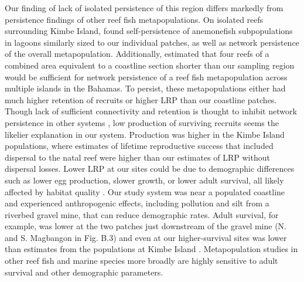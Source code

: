\documentclass[12pt, oneside]{article}   	%
\begin{document}
Our finding of lack of isolated persistence of this region differs markedly from persistence findings of other reef fish metapopulations. On isolated reefs surrounding Kimbe Island, \cite{salles_coral_2015} found self-persistence of anemonefish subpopulations in lagoons similarly sized to our individual patches, as well as network persistence of the overall metapopulation. Additionally, \cite{johnson2018integrating} estimated that four reefs of a combined area equivalent to a coastline section shorter than our sampling region would be sufficient for network persistence of a reef fish metapopulation across multiple islands in the Bahamas. To persist, these metapopulations either had much higher retention of recruits or higher LRP than our coastline patches. Though lack of sufficient connectivity and retention is thought to inhibit network persistence in other systems \citep[e.g., insufficient retention of offspring within reserves for eastern oysters (\textit{Crassostrea virginica}) in North Carolina;][]{puckett2016metapopulation}, low production of surviving recruits seems the likelier explanation in our system. Production was higher in the Kimbe Island populations, where estimates of lifetime reproductive success that included dispersal to the natal reef \citep{salles2020strong} were higher than our estimates of LRP without dispersal losses. Lower LRP at our sites could be due to demographic differences such as lower egg production, slower growth, or lower adult survival, all likely affected by habitat quality \citep[e.g.][]{salles2020strong, hayashi2019low}. Our study system was near a populated coastline and experienced anthropogenic effects, including pollution and silt from a riverbed gravel mine, that can reduce demographic rates. Adult survival, for example, was lower at the two patches just downstream of the gravel mine (N. and S. Magbangon in Fig. B.3) and even at our higher-survival sites was lower than estimates from the populations at Kimbe Island \citep[85\% annual survival,][]{salles_coral_2015}. Metapopulation studies in other reef fish \citep[e.g.][]{figueira2009connectivity} and marine species more broadly \citep{carson2011evaluating} are highly sensitive to adult survival and other demographic parameters.
\end{document}
